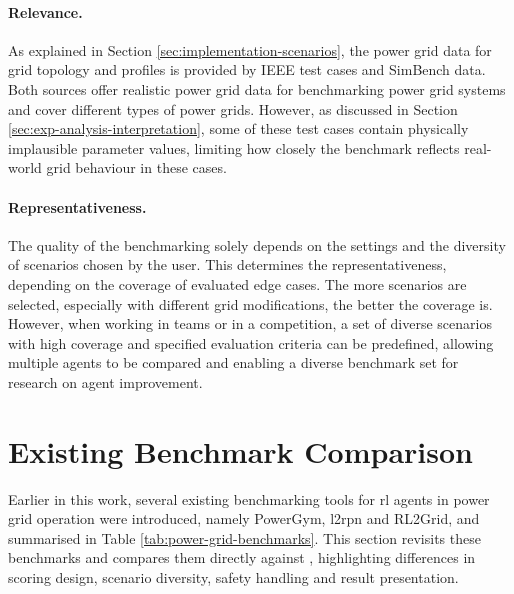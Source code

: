 \paragraph{Relevance.}
As explained in Section \ref{sec:implementation-scenarios}, the power grid data for grid topology and profiles is provided by IEEE test cases and SimBench data. Both sources offer realistic power grid data for benchmarking power grid systems and cover different types of power grids. However, as discussed in Section \ref{sec:exp-analysis-interpretation}, some of these test cases contain physically implausible parameter values, limiting how closely the benchmark reflects real-world grid behaviour in these cases.

\paragraph{Representativeness.}
The quality of the benchmarking solely depends on the settings and the diversity of scenarios chosen by the user. This determines the representativeness, depending on the coverage of evaluated edge cases. The more scenarios are selected, especially with different grid modifications, the better the coverage is. However, when working in teams or in a competition, a set of diverse scenarios with high coverage and specified evaluation criteria can be predefined, allowing multiple agents to be compared and enabling a diverse benchmark set for research on agent improvement.





\section{Existing Benchmark Comparison}\label{sec:existing-benchmark-comparison}
Earlier in this work, several existing benchmarking tools for \ac{rl} agents in power grid operation were introduced, namely PowerGym, \ac{l2rpn} and RL2Grid, and summarised in Table \ref{tab:power-grid-benchmarks}. This section revisits these benchmarks and compares them directly against \benchmark, highlighting differences in scoring design, scenario diversity, safety handling and result presentation.

